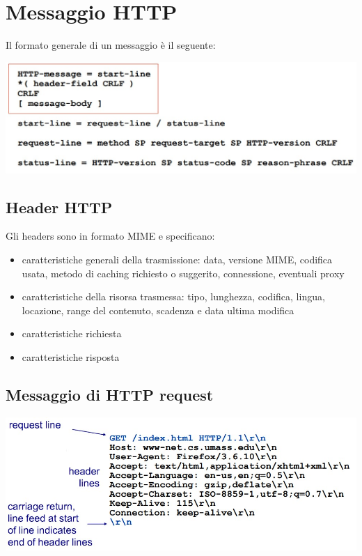\section{Messaggio HTTP}
Il formato generale di un messaggio è il seguente:
\begin{center}
\includegraphics[scale=0.4]{Images/TecnologieWeb/1/MessaggioHTTP.jpg}    
\end{center}

\subsection{Header HTTP}
Gli headers sono in formato MIME e specificano:
\begin{itemize}
    \item caratteristiche generali della trasmissione: data, versione MIME, codifica usata, metodo di caching richiesto o suggerito, connessione, eventuali proxy
    \item caratteristiche della risorsa trasmessa: tipo, lunghezza, codifica, lingua, locazione, range del contenuto, scadenza e data ultima modifica
    \item caratteristiche richiesta
    \item caratteristiche risposta
\end{itemize}

\subsection{Messaggio di HTTP request}
\begin{center}
\includegraphics[scale=0.4]{Images/TecnologieWeb/1/HTTPREquestMessage.jpg}    
\end{center}

